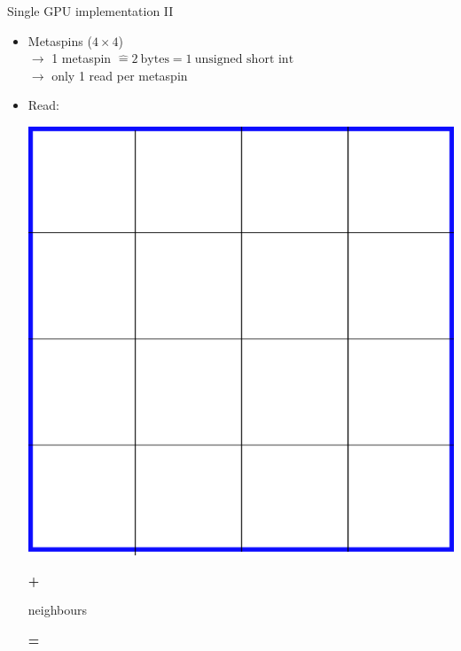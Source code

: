 \documentclass{beamer}
\begin{document}
\begin{frame}{Single GPU implementation II}
\begin{itemize}
    \item Metaspins ($4 \times 4$)\\
        $\rightarrow$ 1 metaspin $\mathrel{\widehat{=}} 2~\text{bytes} = 1~\text{unsigned short int}$\\
        $\rightarrow$ only 1 read per metaspin \pause
    \item Read:\\
        \begin{minipage}{0.1\textwidth}
            \includegraphics[keepaspectratio, width=\textwidth]{images/metaspin.png}
        \end{minipage}
        \begin{minipage}{0.1\textwidth}
            \Huge\textbf{+}
        \end{minipage}
        \begin{minipage}{0.2\textwidth}
            \large neighbours
        \end{minipage}
        \begin{minipage}{0.1\textwidth}
            \Huge\textbf{=}
        \end{minipage}
        \begin{minipage}{0.3\textwidth}

\end{minipage}
\end{itemize}
\end{frame}
\end{document}
